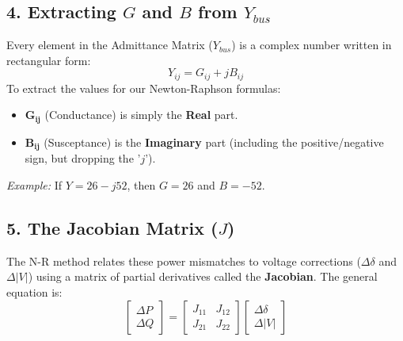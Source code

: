 \documentclass[11pt]{article}
\begin{document}
\subsection*{4. Extracting $G$ and $B$ from $Y_{bus}$}
\begin{conceptbox}
Every element in the Admittance Matrix ($Y_{bus}$) is a complex number written in rectangular form:
\begin{equation*}
    Y_{ij} = G_{ij} + jB_{ij}
\end{equation*}
To extract the values for our Newton-Raphson formulas:
\begin{itemize}
    \item $\mathbf{G_{ij}}$ (Conductance) is simply the \textbf{Real} part.
    \item $\mathbf{B_{ij}}$ (Susceptance) is the \textbf{Imaginary} part (including the positive/negative sign, but dropping the '$j$').
\end{itemize}
\textit{Example:} If $Y = 26 - j52$, then $G = 26$ and $B = -52$.
\end{conceptbox}

\subsection*{5. The Jacobian Matrix ($J$)}
The N-R method relates these power mismatches to voltage corrections ($\Delta \delta$ and $\Delta |V|$) using a matrix of partial derivatives called the \textbf{Jacobian}. The general equation is:
\begin{equation*}
    \begin{bmatrix} \Delta P \\ \Delta Q \end{bmatrix} = 
    \begin{bmatrix} J_{11} & J_{12} \\ J_{21} & J_{22} \end{bmatrix} 
    \begin{bmatrix} \Delta \delta \\ \Delta |V| \end{bmatrix}
\end{equation*}


\newpage
\end{document}
